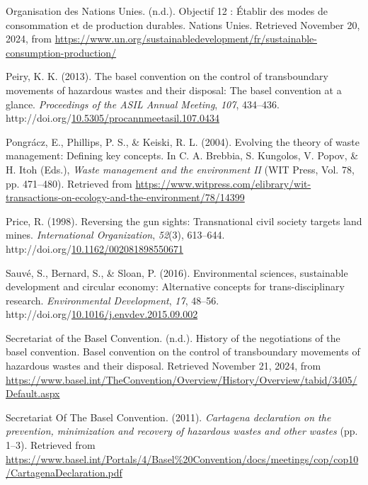 \documentclass[12pt]{ulaval}
\newenvironment{CSLReferences}%
  {}%
  {\par}
\begin{document}
\begin{CSLReferences}{1}{0}
Organisation des Nations Unies. (n.d.). Objectif 12 : Établir des modes de consommation et de production durables. Nations Unies. Retrieved November 20, 2024, from \url{https://www.un.org/sustainabledevelopment/fr/sustainable-consumption-production/}

Peiry, K. K. (2013). The basel convention on the control of transboundary movements of hazardous wastes and their disposal: The basel convention at a glance. \emph{Proceedings of the {ASIL} Annual Meeting}, \emph{107}, 434--436. http://doi.org/\href{https://doi.org/10.5305/procannmeetasil.107.0434}{10.5305/procannmeetasil.107.0434}

Pongrácz, E., Phillips, P. S., \& Keiski, R. L. (2004). Evolving the theory of waste management: Defining key concepts. In C. A. Brebbia, S. Kungolos, V. Popov, \& H. Itoh (Eds.), \emph{Waste management and the environment {II}} ({WIT} Press, Vol. 78, pp. 471--480). Retrieved from \url{https://www.witpress.com/elibrary/wit-transactions-on-ecology-and-the-environment/78/14399}

Price, R. (1998). Reversing the gun sights: Transnational civil society targets land mines. \emph{International Organization}, \emph{52}(3), 613--644. http://doi.org/\href{https://doi.org/10.1162/002081898550671}{10.1162/002081898550671}

Sauvé, S., Bernard, S., \& Sloan, P. (2016). Environmental sciences, sustainable development and circular economy: Alternative concepts for trans-disciplinary research. \emph{Environmental Development}, \emph{17}, 48--56. http://doi.org/\href{https://doi.org/10.1016/j.envdev.2015.09.002}{10.1016/j.envdev.2015.09.002}

Secretariat of the Basel Convention. (n.d.). History of the negotiations of the basel convention. Basel convention on the control of transboundary movements of hazardous wastes and their disposal. Retrieved November 21, 2024, from \url{https://www.basel.int/TheConvention/Overview/History/Overview/tabid/3405/Default.aspx}

Secretariat Of The Basel Convention. (2011). \emph{Cartagena declaration on the prevention, minimization and recovery of hazardous wastes and other wastes} (pp. 1--3). Retrieved from \url{https://www.basel.int/Portals/4/Basel\%20Convention/docs/meetings/cop/cop10/CartagenaDeclaration.pdf}


\end{CSLReferences}
\end{document}
